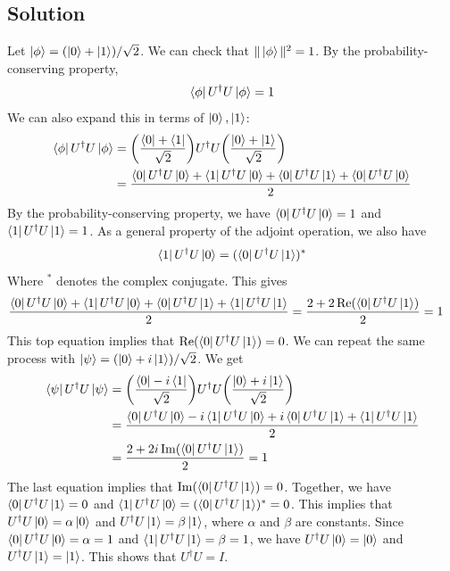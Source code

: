 \documentclass{article}
\begin{document}
{\subsection*{Solution}
Let $\ket{\phi} = (\ket{0}+\ket{1})/\sqrt{2}$. We can check that $\Vert \ket{\phi} \Vert^2 = 1$. By the probability-conserving property,
$$
\bra{\phi}U^\dagger U \ket{\phi} = 1
$$
We can also expand this in terms of $\ket{0}, \ket{1}$:
\begin{align}
\bra{\phi}U^\dagger U \ket{\phi} &= \qty(\frac{\bra{0} + \bra{1}}{\sqrt{2}})U^\dagger U \qty(\frac{\ket{0} + \ket{1}}{\sqrt{2}}) \\
&= \frac{\bra{0}U^\dagger U\ket{0} + \bra{1}U^\dagger U\ket{0} + \bra{0}U^\dagger U\ket{1} + \bra{0}U^\dagger U\ket{0}}{2}
\end{align}
By the probability-conserving property, we have $\bra{0}U^\dagger U \ket{0} = 1$ and $\bra{1}U^\dagger U \ket{1} = 1$. As a general property of the adjoint operation, we also have
$$
\bra{1}U^\dagger U\ket{0} = (\bra{0}U^\dagger U\ket{1})^\ast
$$
Where ${}^\ast$ denotes the complex conjugate. This gives
\begin{align}
\frac{\bra{0}U^\dagger U\ket{0} + \bra{1}U^\dagger U\ket{0} + \bra{0}U^\dagger U\ket{1} + \bra{1}U^\dagger U\ket{1}}{2} &= \frac{2 + 2\Re(\bra{0}U^\dagger U \ket{1})}{2} = 1 
\end{align}
This top equation implies that $\Re(\bra{0}U^\dagger U \ket{1}) = 0$. We can repeat the same process with $\ket{\psi} = (\ket{0}+i\ket{1})/\sqrt{2}$. We get
\begin{align}
\bra{\psi}U^\dagger U \ket{\psi} &= \qty(\frac{\bra{0} -i\bra{1}}{\sqrt{2}})U^\dagger U \qty(\frac{\ket{0} + i\ket{1}}{\sqrt{2}}) \\
&= \frac{\bra{0}U^\dagger U\ket{0} - i\bra{1}U^\dagger U\ket{0} + i\bra{0}U^\dagger U\ket{1} + \bra{1}U^\dagger U\ket{1}}{2} \\
&= \frac{2 + 2i\Im(\bra{0}U^\dagger U\ket{1})}{2} = 1
\end{align}
The last equation implies that $\Im(\bra{0}U^\dagger U \ket{1}) = 0$. Together, we have $\bra{0}U^\dagger U \ket{1} = 0$ and $\bra{1}U^\dagger U \ket{0} = (\bra{0}U^\dagger U \ket{1})^\ast = 0$. This implies that $U^\dagger U\ket{0} = \alpha \ket{0}$ and $U^\dagger U \ket{1} = \beta\ket{1}$, where $\alpha$ and $\beta$ are constants. Since $\bra{0}U^\dagger U \ket{0} = \alpha = 1$ and $\bra{1}U^\dagger U \ket{1} = \beta = 1$, we have $U^\dagger U\ket{0} = \ket{0}$ and $U^\dagger U \ket{1} = \ket{1}$. This shows that $U^\dagger U = I$.

}
\end{document}
